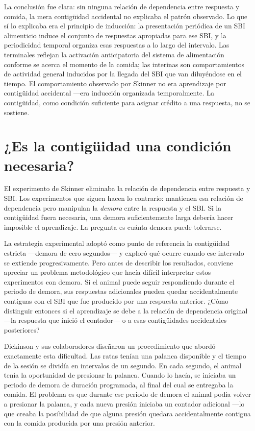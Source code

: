 \documentclass[
  letterpaper,
  DIV=11,
  numbers=noendperiod]{scrreprt}
\begin{document}
\begin{tcolorbox}[enhanced jigsaw, toprule=.15mm, arc=.35mm, colback=white, opacityback=0, colframe=quarto-callout-note-color-frame, breakable, rightrule=.15mm, left=2mm, leftrule=.75mm, bottomrule=.15mm]
La conclusión fue clara: sin ninguna relación de dependencia entre
respuesta y comida, la mera contigüidad accidental no explicaba el
patrón observado. Lo que sí lo explicaba era el principio de inducción:
la presentación periódica de un SBI alimenticio induce el conjunto de
respuestas apropiadas para ese SBI, y la periodicidad temporal organiza
esas respuestas a lo largo del intervalo. Las terminales reflejan la
activación anticipatoria del sistema de alimentación conforme se acerca
el momento de la comida; las interinas son comportamientos de actividad
general inducidos por la llegada del SBI que van diluyéndose en el
tiempo. El comportamiento observado por Skinner no era aprendizaje por
contigüidad accidental ---era inducción organizada temporalmente. La
contigüidad, como condición suficiente para asignar crédito a una
respuesta, no se sostiene.

\section{¿Es la contigüidad una condición
necesaria?}\label{es-la-contiguxfcidad-una-condiciuxf3n-necesaria}

El experimento de Skinner eliminaba la relación de dependencia entre
respuesta y SBI. Los experimentos que siguen hacen lo contrario:
mantienen esa relación de dependencia pero manipulan la \emph{demora}
entre la respuesta y el SBI. Si la contigüidad fuera necesaria, una
demora suficientemente larga debería hacer imposible el aprendizaje. La
pregunta es cuánta demora puede tolerarse.

La estrategia experimental adoptó como punto de referencia la
contigüidad estricta ---demora de cero segundos--- y exploró qué ocurre
cuando ese intervalo se extiende progresivamente. Pero antes de
describir los resultados, conviene apreciar un problema metodológico que
hacía difícil interpretar estos experimentos con demora. Si el animal
puede seguir respondiendo durante el periodo de demora, sus respuestas
adicionales pueden quedar accidentalmente contiguas con el SBI que fue
producido por una respuesta anterior. ¿Cómo distinguir entonces si el
aprendizaje se debe a la relación de dependencia original ---la
respuesta que inició el contador--- o a esas contigüidades accidentales
posteriores?

Dickinson y sus colaboradores diseñaron un procedimiento que abordó
exactamente esta dificultad. Las ratas tenían una palanca disponible y
el tiempo de la sesión se dividía en intervalos de un segundo. En cada
segundo, el animal tenía la oportunidad de presionar la palanca. Cuando
lo hacía, se iniciaba un periodo de demora de duración programada, al
final del cual se entregaba la comida. El problema es que durante ese
periodo de demora el animal podía volver a presionar la palanca, y cada
nueva presión iniciaba un contador adicional ---lo que creaba la
posibilidad de que alguna presión quedara accidentalmente contigua con
la comida producida por una presión anterior.


\end{tcolorbox}
\end{document}
